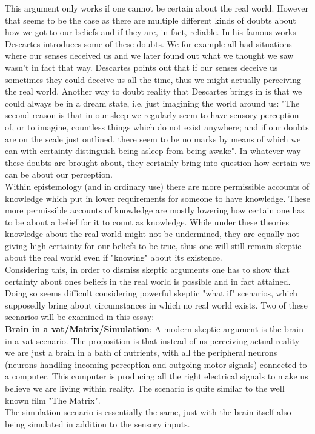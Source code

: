 \documentclass[14pt]{article}
\begin{document}
This argument only works if one cannot be certain about the real world. However that seems to be the case as there are
multiple different kinds of doubts about how we got to our beliefs and if they are, in fact, reliable. In his famous
works Descartes introduces some of these doubts. We for example all had situations where our senses deceived us and
we later found out what we thought we saw wasn't in fact that way. Descartes points out that if our senses deceive
us sometimes they could deceive us all the time, thus we might actually perceiving the real world\autocite*[p. 194]{descartes_1985}.
Another way to doubt reality that Descartes brings in is that we could always be in a dream state, i.e. just imagining the
world around us: "The second reason is that in our sleep we regularly seem to
have sensory perception of, or to imagine, countless things which do not
exist anywhere; and if our doubts are on the scale just outlined, there
seem to be no marks by means of which we can with certainty distinguish
being asleep from being awake"\autocite*[p. 194]{descartes_1985}. In whatever way these doubts are brought about, they certainly
bring into question how certain we can be about our perception. \\

Within epistemology (and in ordinary use) there are more permissible accounts of knowledge which put in lower requirements for someone
to have knowledge. These
more permissible accounts of knowledge are mostly lowering how certain one has to be about a belief for it to count as knowledge.
While under these theories knowledge about the real world might not be undermined, they are equally not giving high
certainty for our beliefs to be true, thus one will still remain skeptic about the real world even if "knowing" about its
existence.\\

Considering this, in order to dismiss skeptic arguments one has to show that certainty about ones beliefs in the real world is possible
and in fact attained. Doing so seems difficult considering powerful skeptic "what if" scenarios, which supposedly bring about
circumstances in which no real world exists. Two of these scenarios will be examined in this essay:\\

\textbf{Brain in a vat/Matrix/Simulation}: A modern skeptic argument is the brain in a vat scenario. The proposition is that instead of us perceiving actual reality we are just 
a brain in a bath of nutrients, with all the peripheral neurons (neurons handling incoming perception and outgoing motor signals) connected
to a computer. This computer is producing all the right electrical signals to make us believe we are living within reality. The scenario is quite
similar to the well known film "The Matrix".\\
The simulation scenario is essentially the same, just with the brain itself also being simulated in addition to the sensory inputs.\\
\end{document}
